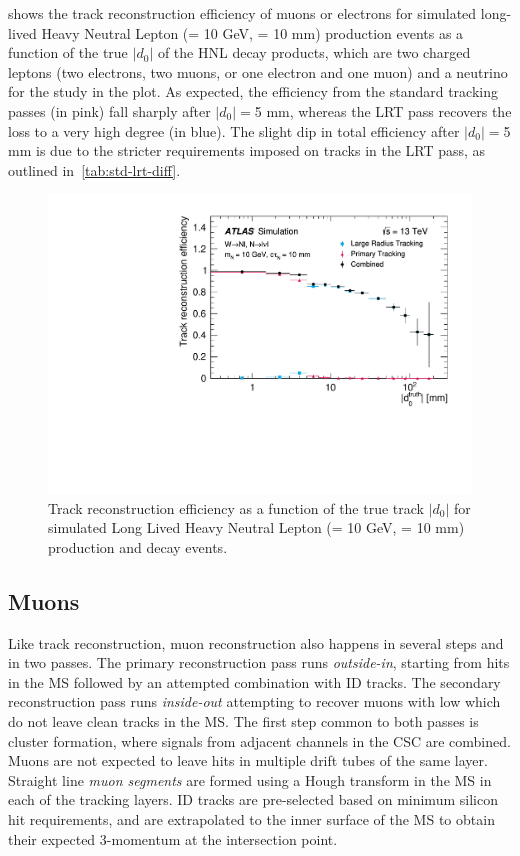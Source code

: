  shows the track reconstruction efficiency of muons or electrons for simulated long-lived Heavy Neutral Lepton (\mhnl = 10 GeV, \ctau = 10 mm) production events as a function of the true $|d_0|$ of the HNL decay products, which are two charged leptons (two electrons, two muons, or one electron and one muon) and a neutrino for the study in the plot. As expected, the efficiency from the standard tracking passes (in pink) fall sharply after $|d_0|=$5 mm, whereas the LRT pass recovers the loss to a very high degree (in blue). The slight dip in total efficiency after $|d_0|=$5 mm is due to the stricter requirements imposed on tracks in the LRT pass, as outlined in~\cref{tab:std-lrt-diff}.

\begin{figure}[!ht]
    \centering
    \includegraphics[width=0.8\linewidth]{figures//experiment/track-eff-HNL.pdf}
    \caption{Track reconstruction efficiency as a function of the true track $|d_0|$ for simulated Long Lived Heavy Neutral Lepton (\mhnl = 10 GeV, \ctau = 10 mm) production and decay events.~\cite{IDTR-2021-03}}
    \label{fig:track-reco-eff-HNL}
\end{figure}


\subsection{Muons}
Like track reconstruction, muon reconstruction also happens in several steps and in two passes. The primary reconstruction pass runs \textit{outside-in}, starting from hits in the MS followed by an attempted combination with ID tracks. The secondary reconstruction pass runs \textit{inside-out} attempting to recover muons with low \pT which do not leave clean tracks in the MS. The first step common to both passes is cluster formation, where signals from adjacent channels in the CSC are combined. Muons are not expected to leave hits in multiple drift tubes of the same layer. Straight line \textit{muon segments} are formed using a Hough transform in the MS in each of the tracking layers. ID tracks are pre-selected based on minimum silicon hit requirements, and are extrapolated to the inner surface of the MS to obtain their expected 3-momentum at the intersection point.

